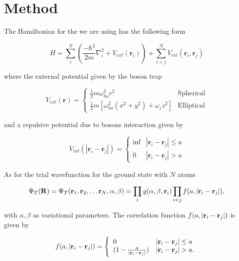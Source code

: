 \documentclass[12pt]{article}
\begin{document}
\section{Method}

  The Hamiltonian for the we are using has the following form

  \begin{equation}
     H = \sum_i^N \left(\frac{-\hbar^2}{2m}\nabla^2_i + V_{ext}(\bm{r}_i)\right) + %
     \sum_{i< j}^N V_{int}(\bm{r}_i,\bm{r}_j)
  \end{equation}

  where the external potential given by the boson trap

  \begin{equation}
    V_{ext}(\bm{r}) = \left\{
    \begin{array}{lr}
      \frac{1}{2}m\omega_{ho}^2r^2 & \text{Spherical}\\
      \frac{1}{2}m[\omega_{ho}^2(x^2 + y^2) + \omega_z z^2] & \text{Elliptical}
    \end{array}
    \right.
  \end{equation}

  and a repulsive potential due to bosons interaction given by

  \begin{equation}
    V_{int}(|\bm{r}_i - \bm{r}_j|) = \left\{
    \begin{array}{lr}
      \inf & |\bm{r}_i - \bm{r}_j| \leq a\\
      0 & |\bm{r}_i - \bm{r}_j| > a
    \end{array}
    \right.
  \end{equation}

  As for the trial wavefunction for the ground state with $N$ atoms

  \begin{equation}
    \Psi_T({\bf R})=\Psi_T({\bf r}_1, {\bf r}_2, \dots {\bf r}_N,\alpha,\beta)=\prod_i%
    g(\alpha,\beta,{\bf r}_i)\prod_{i<j}f(a,|{\bf r}_i-{\bf r}_j|),
  \end{equation}

  with $\alpha, \beta$ as variational parameters. The correlation function 
  $f(a,|{\bf r}_i-{\bf r}_j|)$ is given by

  \begin{equation}
    f(a,|{\bf r}_i-{\bf r}_j|)=\Bigg\{
    \begin{array}{ll}
      0 & {|{\bf r}_i-{\bf r}_j|} \leq {a}\\
	(1-\frac{a}{|{\bf r}_i-{\bf r}_j|}) & {|{\bf r}_i-{\bf r}_j|} > {a}.
    \end{array}
  \end{equation}  
 
\end{document}

